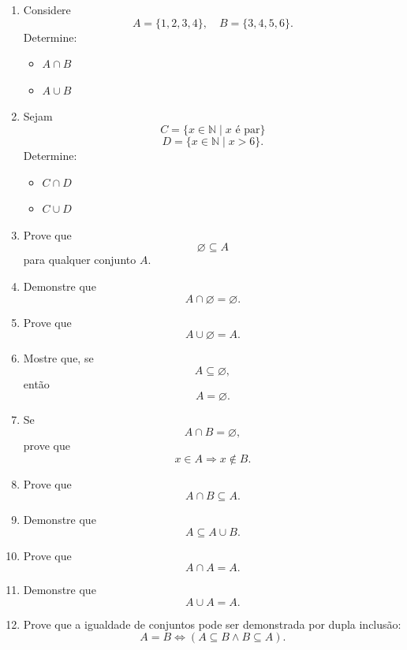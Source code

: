 \documentclass[12pt]{article}
\begin{document}
\begin{enumerate}
\item Considere
\[
A=\{1,2,3,4\}, \quad B=\{3,4,5,6\}.
\]
Determine:

\begin{itemize}
\item[(a)] $A\cap B$
\item[(b)] $A\cup B$
\end{itemize}

\item Sejam
\[
C=\{x\in\mathbb{N}\mid x \text{ é par}\}
\]
\[
D=\{x\in\mathbb{N}\mid x>6\}.
\]
Determine:

\begin{itemize}
\item[(a)] $C\cap D$
\item[(b)] $C\cup D$
\end{itemize}

\item Prove que
\[
\varnothing \subseteq A
\]
para qualquer conjunto $A$.

\item Demonstre que
\[
A\cap\varnothing=\varnothing.
\]

\item Prove que
\[
A\cup\varnothing=A.
\]

\item Mostre que, se
\[
A\subseteq\varnothing,
\]
então
\[
A=\varnothing.
\]

\item Se
\[
A\cap B=\varnothing,
\]
prove que
\[
x\in A \Rightarrow x\notin B.
\]

\item Prove que
\[
A\cap B \subseteq A.
\]

\item Demonstre que
\[
A \subseteq A\cup B.
\]

\item Prove que
\[
A\cap A=A.
\]

\item Demonstre que
\[
A\cup A=A.
\]

\item Prove que a igualdade de conjuntos pode ser demonstrada por dupla inclusão:
\[
A=B \iff (A\subseteq B \land B\subseteq A).
\]

\end{enumerate}
\end{document}
